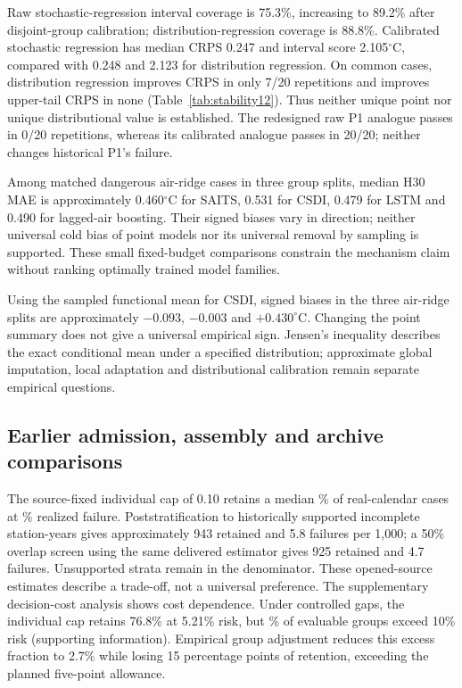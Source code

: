 \documentclass[draft,linenumbers]{agujournal2025}
\begin{document}
Raw stochastic-regression interval coverage is 75.3\%, increasing to 89.2\% after disjoint-group calibration; distribution-regression coverage is 88.8\%. Calibrated stochastic regression has median CRPS 0.247 and interval score 2.105$^{\circ}$C, compared with 0.248 and 2.123 for distribution regression. On common cases, distribution regression improves CRPS in only 7/20 repetitions and improves upper-tail CRPS in none (Table~\ref{tab:stability12}). Thus neither unique point nor unique distributional value is established. The redesigned raw P1 analogue passes in 0/20 repetitions, whereas its calibrated analogue passes in 20/20; neither changes historical P1's failure.

Among matched dangerous air-ridge cases in three group splits, median H30 MAE is approximately 0.460$^{\circ}$C for SAITS, 0.531 for CSDI, 0.479 for LSTM and 0.490 for lagged-air boosting. Their signed biases vary in direction; neither universal cold bias of point models nor its universal removal by sampling is supported. These small fixed-budget comparisons constrain the mechanism claim without ranking optimally trained model families.

Using the sampled functional mean for CSDI, signed biases in the three air-ridge splits are approximately $-0.093$, $-0.003$ and $+0.430^{\circ}$C. Changing the point summary does not give a universal empirical sign. Jensen's inequality describes the exact conditional mean under a specified distribution; approximate global imputation, local adaptation and distributional calibration remain separate empirical questions.




\subsection{Earlier admission, assembly and archive comparisons}
The source-fixed individual cap of 0.10 retains a median \RRetention\% of real-calendar cases at \RRisk\% realized failure. Poststratification to historically supported incomplete station-years gives approximately 943 retained and 5.8 failures per 1,000; a 50\% overlap screen using the same delivered estimator gives 925 retained and 4.7 failures. Unsupported strata remain in the denominator. These opened-source estimates describe a trade-off, not a universal preference. The supplementary decision-cost analysis shows cost dependence. Under controlled gaps, the individual cap retains 76.8\% at 5.21\% risk, but \RGroupExcess\% of evaluable groups exceed 10\% risk (supporting information). Empirical group adjustment reduces this excess fraction to 2.7\% while losing 15 percentage points of retention, exceeding the planned five-point allowance.
\end{document}
